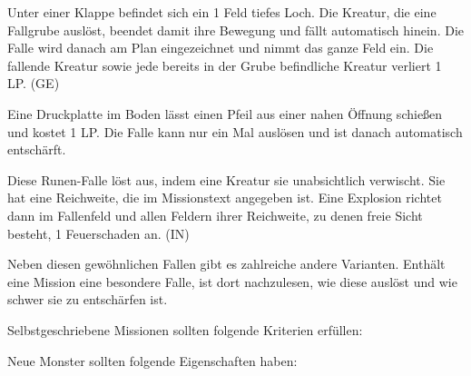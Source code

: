 {		 Unter einer Klappe befindet sich ein 1 Feld tiefes Loch. Die Kreatur, die eine Fallgrube auslöst, beendet damit ihre Bewegung und fällt automatisch hinein. Die Falle wird danach am Plan eingezeichnet und nimmt das ganze Feld ein. Die fallende Kreatur sowie jede bereits in der Grube befindliche Kreatur verliert 1 LP. (GE)

		 Eine Druckplatte im Boden lässt einen Pfeil aus einer nahen Öffnung schießen und kostet 1 LP. Die Falle kann nur ein Mal auslösen und ist danach automatisch entschärft.

		 Diese Runen-Falle löst aus, indem eine Kreatur sie unabsichtlich verwischt. Sie hat eine Reichweite, die im Missionstext angegeben ist. Eine Explosion richtet dann im Fallenfeld und allen Feldern ihrer Reichweite, zu denen freie Sicht besteht, 1 Feuerschaden an. (IN)

		Neben diesen gewöhnlichen Fallen gibt es zahlreiche andere Varianten. Enthält eine Mission eine besondere Falle, ist dort nachzulesen, wie diese auslöst und wie schwer sie zu entschärfen ist.

		Selbstgeschriebene Missionen sollten folgende Kriterien erfüllen:


		Neue Monster sollten folgende Eigenschaften haben:

}
